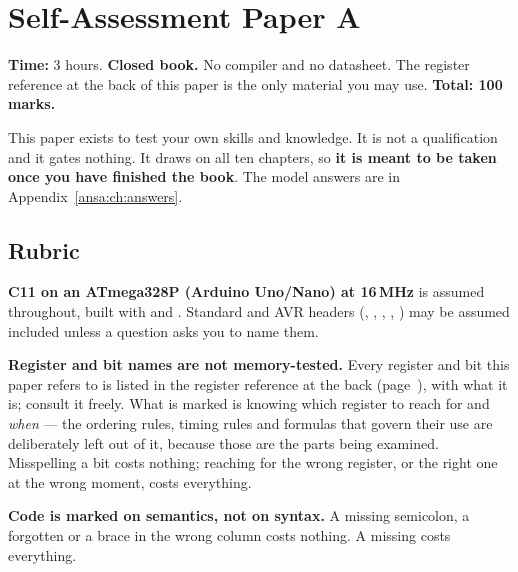
\chapter{Self-Assessment Paper A}
\label{exa:ch:paper}

\noindent\textbf{Time:} 3 hours. \textbf{Closed book.} No compiler and no datasheet. The register
reference at the back of this paper is the only material you may use. \textbf{Total: 100 marks.}

This paper exists to test your own skills and knowledge. It is not a qualification and it gates
nothing. It draws on all ten chapters, so \textbf{it is meant to be taken once you have finished
the book}. The model answers are in Appendix~\ref{ansa:ch:answers}.

\section*{Rubric}
\textbf{C11 on an ATmega328P (Arduino Uno/Nano) at 16\,MHz} is assumed throughout, built with
 and . Standard and AVR headers (,
, , , ) may be
assumed included unless a question asks you to name them.

\textbf{Register and bit names are not memory-tested.} Every register and bit this paper refers to
is listed in the register reference at the back (page~\pageref{exa:sec:registers}), with what it
is; consult it freely. What is marked is knowing which register to reach for and \emph{when} ---
the ordering rules, timing rules and formulas that govern their use are deliberately left out of
it, because those are the parts being examined. Misspelling a bit costs nothing; reaching for the
wrong register, or the right one at the wrong moment, costs everything.

\textbf{Code is marked on semantics, not on syntax.} A missing semicolon, a forgotten
 or a brace in the wrong column costs nothing. A missing  costs
everything.

